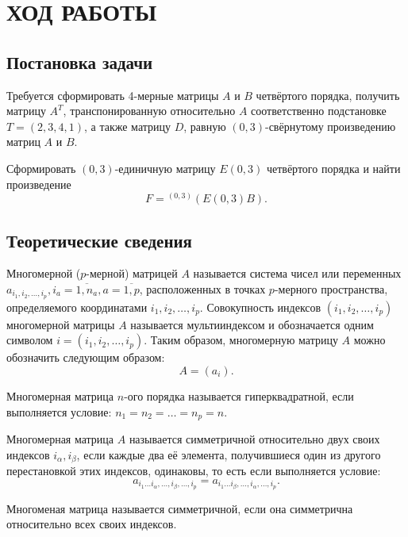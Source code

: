 \section{ХОД РАБОТЫ}

\subsection{Постановка задачи}

Требуется сформировать 4-мерные матрицы $A$ и $B$ четвёртого порядка,
получить матрицу $A^T$, транспонированную относительно $A$ соответственно
подстановке $T = (2,3,4,1)$, а также матрицу $D$, равную $(0, 3)$-свёрнутому
произведению матриц $A$ и $B$.

Сформировать $(0, 3)$-единичную матрицу $E(0,3)$ четвёртого порядка
и найти произведение
\begin{equation*}
  F = {}^{(0,3)}(E(0, 3)B).
\end{equation*}


\subsection{Теоретические сведения}
\label{sub:theory}

Многомерной ($p$-мерной) матрицей $A$ называется система чисел или
переменных $a_{i_1, i_2, \dots, i_p}, i_a = \overline{1, n_a}, a = \overline{1,p}$,
расположенных в точках $p$-мерного пространства, определяемого координатами $i_1, i_2, \dots, i_p$.
Совокупность индексов $(i_1, i_2, \dots, i_p)$ многомерной матрицы $A$
называется мультииндексом и обозначается одним символом $i = (i_1, i_2, \dots, i_p)$.
Таким образом, многомерную матрицу $A$ можно обозначить следующим образом:
\begin{equation*}
  A = (a_i).
\end{equation*}

Многомерная матрица $n$-ого порядка называется гиперквадратной, если выполняется условие:
$n_1 = n_2 = \dots = n_p = n$.

Многомерная матрица $A$ называется симметричной относительно двух своих
индексов $i_\alpha, i_\beta$, если каждые два её элемента, получившиеся
один из другого перестановкой этих индексов, одинаковы, то есть если
выполняется условие:
\begin{equation*}
  a_{i_1 \dots i_\alpha, \dots, i_\beta, \dots, i_p} = a_{i_1 \dots i_\beta, \dots, i_\alpha, \dots, i_p}.
\end{equation*} 

Многоменая матрица называется симметричной,
если она симметрична относительно всех своих индексов.


